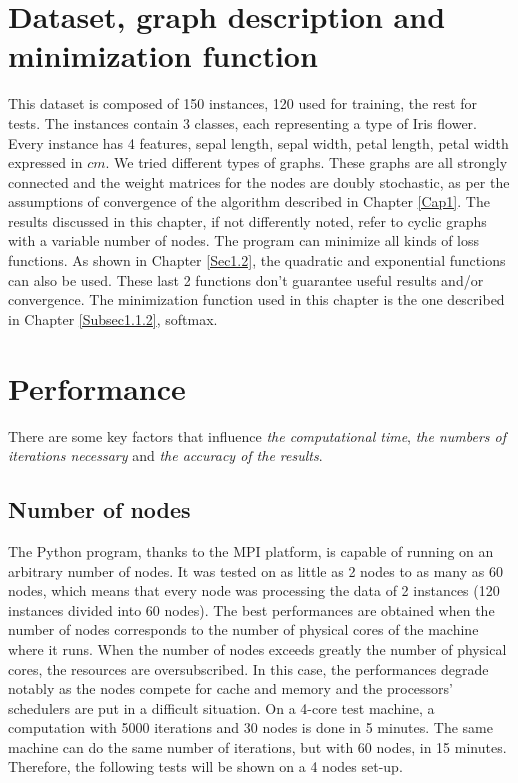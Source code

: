 \documentclass[a4paper,11pt,oneside]{book}
\begin{document}
\section{Dataset, graph description and minimization function} \label{Sec2.1}
This dataset is composed of 150 instances, 120 used for training, the rest for tests. The instances contain 3 classes, each representing a type of Iris flower. Every instance has 4 features, sepal length, sepal width, petal length, petal width expressed in $cm$. We tried different types of graphs. These graphs are all strongly connected and the weight matrices for the nodes are doubly stochastic, as per the assumptions of convergence of the algorithm described in Chapter \ref{Cap1}. The results discussed in this chapter, if not differently noted, refer to cyclic graphs with a variable number of nodes. The program can minimize all kinds of loss functions. As shown in Chapter \ref{Sec1.2}, the quadratic and exponential functions can also be used. These last 2 functions don't guarantee useful results and/or convergence. The minimization function used in this chapter is the one described in Chapter \ref{Subsec1.1.2}, softmax.

\section{Performance} \label{Sec2.2}
There are some key factors that influence \textit{the computational time}, \textit{the numbers of iterations necessary} and \textit{the accuracy of the results}.\\

\subsection{Number of nodes} \label{Subsec2.2.1}
The Python program, thanks to the MPI platform, is capable of running on an arbitrary number of nodes. It was tested on as little as 2 nodes to as many as 60 nodes, which means that every node was processing the data of 2 instances (120 instances divided into 60 nodes). The best performances are obtained when the number of nodes corresponds to the number of physical cores of the machine where it runs. When the number of nodes exceeds greatly the number of physical cores, the resources are oversubscribed. In this case, the performances degrade notably as the nodes compete for cache and memory and the processors' schedulers are put in a difficult situation. On a 4-core test machine, a computation with 5000 iterations and 30 nodes is done in 5 minutes. The same machine can do the same number of iterations, but with 60 nodes, in 15 minutes. Therefore, the following tests will be shown on a 4 nodes set-up. \\
\end{document}
